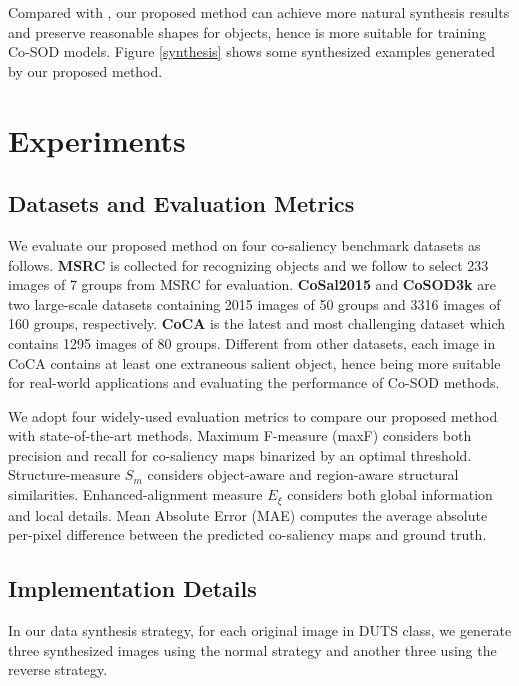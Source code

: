 \documentclass[10pt,twocolumn,letterpaper]{article}
\begin{document}
Compared with \cite{zhang2020gicd}, our proposed method can achieve more natural synthesis results and preserve reasonable shapes for objects, hence is more suitable for training Co-SOD models. Figure \ref{synthesis} shows some synthesized examples generated by our proposed method.

\section{Experiments}

\subsection{Datasets and Evaluation Metrics}

We evaluate our proposed method on four co-saliency benchmark datasets as follows. \textbf{MSRC} \cite{winn2005object} is collected for recognizing objects and we follow \cite{zhang2016detection, fu2013cluster} to select 233 images of 7 groups from MSRC for evaluation.
\textbf{CoSal2015} \cite{zhang2015co} and \textbf{CoSOD3k} \cite{fan2020taking} are two large-scale datasets containing 2015 images of 50 groups and 3316 images of 160 groups, respectively.
\textbf{CoCA} \cite{zhang2020gicd} is the latest and most challenging dataset which contains 1295 images of 80 groups. Different from other datasets, each image in CoCA contains at least one extraneous salient object, hence being more suitable for real-world applications and evaluating the performance of Co-SOD methods.

We adopt four widely-used evaluation metrics to compare our proposed method with state-of-the-art methods. Maximum F-measure (maxF) considers both precision and recall for co-saliency maps binarized by an optimal threshold. Structure-measure $S_m$ \cite{fan2017structure} considers object-aware and region-aware structural similarities. Enhanced-alignment measure $E_\xi$ \cite{Fan2018Enhanced} considers both global information and local details. Mean Absolute Error (MAE) computes the average absolute per-pixel difference between the predicted co-saliency maps and ground truth.

\subsection{Implementation Details}
In our data synthesis strategy, for each original image in DUTS class,
we generate three synthesized images using the normal strategy and another three using the reverse strategy.
\end{document}
